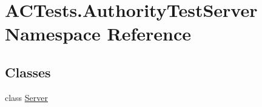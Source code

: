 \hypertarget{namespace_a_c_tests_1_1_authority_test_server}{}\section{A\+C\+Tests.\+Authority\+Test\+Server Namespace Reference}
\label{namespace_a_c_tests_1_1_authority_test_server}
\subsection*{Classes}
\begin{DoxyCompactItemize}
\item 
class \mbox{\hyperlink{class_a_c_tests_1_1_authority_test_server_1_1_server}{Server}}
\end{DoxyCompactItemize}
